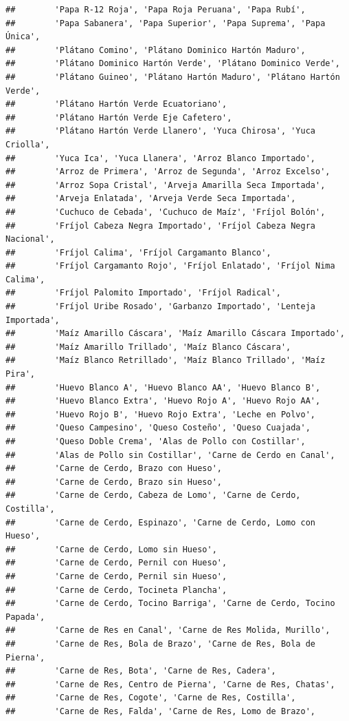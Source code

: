 \documentclass[
]{book}
\begin{document}
\begin{verbatim}
##        'Papa R-12 Roja', 'Papa Roja Peruana', 'Papa Rubí',
##        'Papa Sabanera', 'Papa Superior', 'Papa Suprema', 'Papa Única',
##        'Plátano Comino', 'Plátano Dominico Hartón Maduro',
##        'Plátano Dominico Hartón Verde', 'Plátano Dominico Verde',
##        'Plátano Guineo', 'Plátano Hartón Maduro', 'Plátano Hartón Verde',
##        'Plátano Hartón Verde Ecuatoriano',
##        'Plátano Hartón Verde Eje Cafetero',
##        'Plátano Hartón Verde Llanero', 'Yuca Chirosa', 'Yuca Criolla',
##        'Yuca Ica', 'Yuca Llanera', 'Arroz Blanco Importado',
##        'Arroz de Primera', 'Arroz de Segunda', 'Arroz Excelso',
##        'Arroz Sopa Cristal', 'Arveja Amarilla Seca Importada',
##        'Arveja Enlatada', 'Arveja Verde Seca Importada',
##        'Cuchuco de Cebada', 'Cuchuco de Maíz', 'Fríjol Bolón',
##        'Fríjol Cabeza Negra Importado', 'Fríjol Cabeza Negra Nacional',
##        'Fríjol Calima', 'Fríjol Cargamanto Blanco',
##        'Fríjol Cargamanto Rojo', 'Fríjol Enlatado', 'Fríjol Nima Calima',
##        'Fríjol Palomito Importado', 'Fríjol Radical',
##        'Fríjol Uribe Rosado', 'Garbanzo Importado', 'Lenteja Importada',
##        'Maíz Amarillo Cáscara', 'Maíz Amarillo Cáscara Importado',
##        'Maíz Amarillo Trillado', 'Maíz Blanco Cáscara',
##        'Maíz Blanco Retrillado', 'Maíz Blanco Trillado', 'Maíz Pira',
##        'Huevo Blanco A', 'Huevo Blanco AA', 'Huevo Blanco B',
##        'Huevo Blanco Extra', 'Huevo Rojo A', 'Huevo Rojo AA',
##        'Huevo Rojo B', 'Huevo Rojo Extra', 'Leche en Polvo',
##        'Queso Campesino', 'Queso Costeño', 'Queso Cuajada',
##        'Queso Doble Crema', 'Alas de Pollo con Costillar',
##        'Alas de Pollo sin Costillar', 'Carne de Cerdo en Canal',
##        'Carne de Cerdo, Brazo con Hueso',
##        'Carne de Cerdo, Brazo sin Hueso',
##        'Carne de Cerdo, Cabeza de Lomo', 'Carne de Cerdo, Costilla',
##        'Carne de Cerdo, Espinazo', 'Carne de Cerdo, Lomo con Hueso',
##        'Carne de Cerdo, Lomo sin Hueso',
##        'Carne de Cerdo, Pernil con Hueso',
##        'Carne de Cerdo, Pernil sin Hueso',
##        'Carne de Cerdo, Tocineta Plancha',
##        'Carne de Cerdo, Tocino Barriga', 'Carne de Cerdo, Tocino Papada',
##        'Carne de Res en Canal', 'Carne de Res Molida, Murillo',
##        'Carne de Res, Bola de Brazo', 'Carne de Res, Bola de Pierna',
##        'Carne de Res, Bota', 'Carne de Res, Cadera',
##        'Carne de Res, Centro de Pierna', 'Carne de Res, Chatas',
##        'Carne de Res, Cogote', 'Carne de Res, Costilla',
##        'Carne de Res, Falda', 'Carne de Res, Lomo de Brazo',

\end{verbatim}
\end{document}

